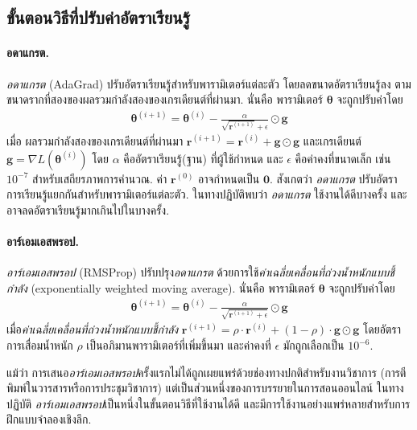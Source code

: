 \subsection{ขั้นตอนวิธีที่ปรับค่าอัตราเรียนรู้}
\label{sub: adv optimization algo.}

\paragraph{อดาแกรต.}
\textit{อดาแกรต} (AdaGrad)
ปรับอัตราเรียนรู้สำหรับพารามิเตอร์แต่ละตัว 
โดยลดขนาดอัตราเรียนรู้ลง
ตามขนาดรากที่สองของผลรวมกำลังสองของเกรเดียนต์ที่ผ่านมา.
นั่นคือ
พารามิเตอร์ $\bm{\theta}$ จะถูกปรับค่าโดย
%
\begin{align}
\bm{\theta}^{(i+1)} = 
\bm{\theta}^{(i)} - \frac{\alpha}{\sqrt{\bm{r}^{(i+1)}} + \epsilon} \odot \bm{g}
\label{eq: adagrad}
\end{align}
เมื่อ ผลรวมกำลังสองของเกรเดียนต์ที่ผ่านมา
$\bm{r}^{(i+1)} = \bm{r}^{(i)} + 
\bm{g} \odot \bm{g}$
และเกรเดียนต์
$\bm{g} = \nabla L(\bm{\theta}^{(i)})$
โดย $\alpha$ คืออัตราเรียนรู้(ฐาน) ที่ผู้ใช้กำหนด
และ $\epsilon$ คือค่าคงที่ขนาดเล็ก เช่น $10^{-7}$ สำหรับเสถียรภาพการคำนวณ.
ค่า $\bm{r}^{(0)}$ อาจกำหนดเป็น $\bm{0}$.
สังเกตว่า 
\textit{อดาแกรต} ปรับอัตราการเรียนรู้แยกกันสำหรับพารามิเตอร์แต่ละตัว.
ในทางปฏิบัติพบว่า
\textit{อดาแกรต} 
ใช้งานได้ดีบางครั้ง และอาจลดอัตราเรียนรู้มากเกินไปในบางครั้ง\cite{GoodfellowEtAl2016}.


\paragraph{อาร์เอมเอสพรอป.}
\textit{อาร์เอมเอสพรอป} (RMSProp)
ปรับปรุง\textit{อดาแกรต}
ด้วยการใช้\textit{ค่าเฉลี่ยเคลื่อนที่ถ่วงน้ำหนักแบบชี้กำลัง} (exponentially weighted moving average).
นั่นคือ
พารามิเตอร์ $\bm{\theta}$ จะถูกปรับค่าโดย
%
\begin{align}
\bm{\theta}^{(i+1)} = 
\bm{\theta}^{(i)} - \frac{\alpha}{\sqrt{\bm{r}^{(i+1)} + \epsilon}} \odot \bm{g}
\label{eq: RMSprop}
\end{align}
เมื่อ\textit{ค่าเฉลี่ยเคลื่อนที่ถ่วงน้ำหนักแบบชี้กำลัง}
$\bm{r}^{(i+1)} = \rho \cdot \bm{r}^{(i)} + (1 - \rho) \cdot \bm{g} \odot \bm{g}$
โดยอัตราการเสื่อมน้ำหนัก $\rho$ เป็นอภิมานพารามิเตอร์ที่เพิ่มขึ้นมา
และค่าคงที่ $\epsilon$ มักถูกเลือกเป็น $10^{-6}$.

แม้ว่า 
การเสนอ\textit{อาร์เอมเอสพรอป}ครั้งแรกไม่ได้ถูกเผยแพร่ด้วยช่องทางปกติสำหรับงานวิชาการ (การตีพิมพ์ในวารสารหรือการประชุมวิชาการ)
แต่เป็นส่วนหนึ่งของการบรรยายในการสอนออนไลน์\cite{Hinton2012a}
ในทางปฏิบัติ \textit{อาร์เอมเอสพรอป}เป็นหนึ่งในขั้นตอนวิธีที่ใช้งานได้ดี และมีการใช้งานอย่างแพร่หลายสำหรับการฝึกแบบจำลองเชิงลึก\cite{GoodfellowEtAl2016}.


